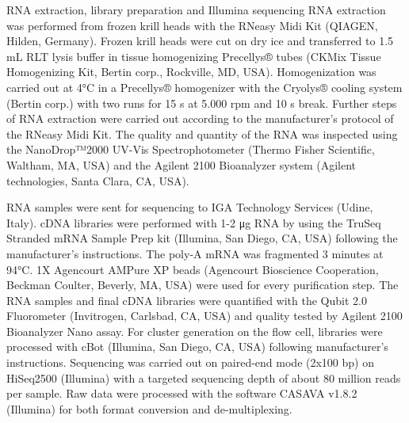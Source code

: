 RNA extraction, library preparation and Illumina sequencing
RNA extraction was performed from frozen krill heads with the RNeasy Midi Kit (QIAGEN, Hilden, Germany). Frozen krill heads were cut on dry ice and transferred to 1.5 mL RLT lysis buffer in tissue homogenizing Precellys® tubes (CKMix Tissue Homogenizing Kit, Bertin corp., Rockville, MD, USA). Homogenization was carried out at 4°C in a Precellys® homogenizer with the Cryolys® cooling system (Bertin corp.) with two runs for 15 s at 5.000 rpm and 10 s break. Further steps of RNA extraction were carried out according to the manufacturer's protocol of the RNeasy Midi Kit. The quality and quantity of the RNA was inspected using the NanoDrop™2000 UV-Vis Spectrophotometer (Thermo Fisher Scientific, Waltham, MA, USA) and the Agilent 2100 Bioanalyzer system (Agilent technologies, Santa Clara, CA, USA).

RNA samples were sent for sequencing to IGA Technology Services (Udine, Italy). cDNA libraries were performed with 1-2 μg RNA by using the TruSeq Stranded mRNA Sample Prep kit (Illumina, San Diego, CA, USA) following the manufacturer's instructions. The poly-A mRNA was fragmented 3 minutes at 94°C. 1X Agencourt AMPure XP beads (Agencourt Bioscience Cooperation, Beckman Coulter, Beverly, MA, USA) were used for every purification step. The RNA samples and final cDNA libraries were quantified with the Qubit 2.0 Fluorometer (Invitrogen, Carlsbad, CA, USA) and quality tested by Agilent 2100 Bioanalyzer Nano assay.  For cluster generation on the flow cell, libraries were processed with cBot (Illumina, San Diego, CA, USA) following manufacturer's instructions. Sequencing was carried out on paired-end mode (2x100 bp) on HiSeq2500 (Illumina) with a targeted sequencing depth of about 80 million reads per sample. Raw data were processed with the software CASAVA v1.8.2 (Illumina) for both format conversion and de-multiplexing.

